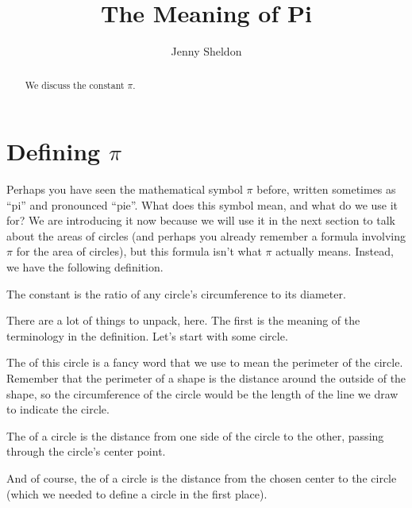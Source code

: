 \documentclass{ximera}
\title{The Meaning of Pi}
\author{Jenny Sheldon}
\begin{document}
\begin{abstract}
We discuss the constant $\pi$.
\end{abstract}
\maketitle

\section{Defining $\pi$}

Perhaps you have seen the mathematical symbol $\pi$ before, written sometimes as ``pi'' and pronounced ``pie''. What does this symbol mean, and what do we use it for? We are introducing it now because we will use it in the next section to talk about the areas of circles (and perhaps you already remember a formula involving $\pi$ for the area of circles), but this formula isn't what $\pi$ actually means. Instead, we have the following definition.

\begin{definition}
The constant \dfn{$\pi$} is the ratio of any circle's circumference to its diameter.
\end{definition}

There are a lot of things to unpack, here. The first is the meaning of the terminology in the definition. Let's start with some circle.
\begin{image}
\end{image}
The  of this circle is a fancy word that we use to mean the perimeter of the circle. Remember that the perimeter of a shape is the distance around the outside of the shape, so the circumference of the circle would be the length of the line we draw to indicate the circle.

The  of a circle is the distance from one side of the circle to the other, passing through the circle's center point.

And of course, the  of a circle is the distance from the chosen center to the circle (which we needed to define a circle in the first place).
\begin{image}
\end{image}
\end{document}
